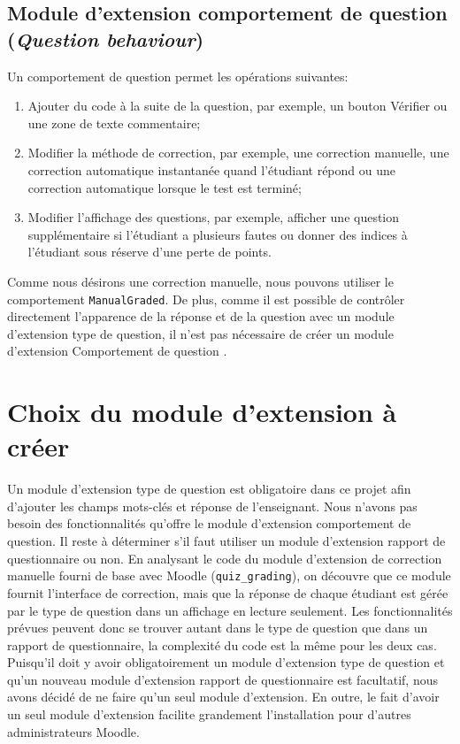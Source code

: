 \subsection{Module d'extension comportement de question (\textit{Question behaviour})}
Un comportement de question permet les op\'erations suivantes:
\begin{enumerate}
  \item Ajouter du code \`a la suite de la question, par exemple, un bouton \og V\'erifier \fg{} ou une zone de texte commentaire;
  
  \item Modifier la m\'ethode de correction, par exemple, une correction manuelle, une correction automatique instantan\'ee quand l'\'etudiant r\'epond ou une correction automatique lorsque le test est termin\'e;
  
  \item Modifier l'affichage des questions, par exemple, afficher une question suppl\'ementaire si l'\'etudiant a plusieurs fautes ou donner des indices \`a l'\'etudiant sous r\'eserve d'une perte de points.
\end{enumerate}
Comme nous d\'esirons une correction manuelle, nous pouvons utiliser le comportement \texttt{ManualGraded}.
De plus, comme il est possible de contr\^oler directement l'apparence de la r\'eponse et de la question avec un module d'extension type de question, il n'est pas n\'ecessaire de cr\'eer un module d'extension \og Comportement de question \fg{}.

\section{Choix du module d'extension \`a cr\'eer}
Un module d'extension type de question est obligatoire dans ce projet afin d'ajouter les champs mots-cl\'es et r\'eponse de l'enseignant.
Nous n'avons pas besoin des fonctionnalit\'es qu'offre le module d'extension comportement de question.
Il reste \`a d\'eterminer s'il faut utiliser un module d'extension rapport de questionnaire ou non.
En analysant le code du module d'extension de correction manuelle fourni de base avec Moodle (\texttt{quiz\_grading}), on d\'ecouvre que ce module fournit l'interface de correction, mais que la r\'eponse de chaque \'etudiant est g\'er\'ee par le type de question dans un affichage en lecture seulement.
Les fonctionnalit\'es pr\'evues peuvent donc se trouver autant dans le type de question que dans un rapport de questionnaire, la complexit\'e du code est la m\^eme pour les deux cas.
Puisqu'il doit y avoir obligatoirement un module d'extension type de question et qu'un nouveau module d'extension rapport de questionnaire est facultatif, nous avons d\'ecid\'e de ne faire qu'un seul module d'extension.
En outre, le fait d'avoir un seul module d'extension facilite grandement l'installation pour d'autres administrateurs Moodle.
